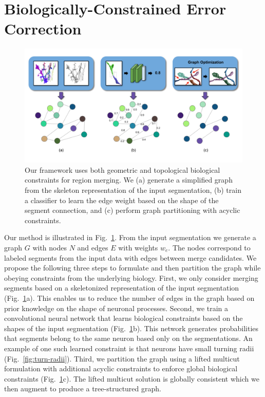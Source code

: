 \section{Biologically-Constrained Error Correction}

\begin{figure}[t!]
	\centering
	\includegraphics[width=0.75\linewidth]{./figures/teaser_v4.png}
	\caption{Our framework uses both geometric and topological biological constraints for region merging. We (a) generate a simplified graph from the skeleton representation of the input segmentation, (b) train a classifier to learn the edge weight based on the shape of the segment connection, and (c) perform graph partitioning with acyclic constraints.}
	\label{fig:teaser_pipeline}
\end{figure}

Our method is illustrated in Fig.~\ref{fig:teaser_pipeline}.
From the input segmentation we generate a graph $G$ with nodes $N$ and edges $E$ with weights $w_e$. 
The nodes correspond to labeled segments from the input data with edges between merge candidates.
We propose the following three steps to formulate and then partition the graph while obeying constraints from the underlying biology.
First, we only consider merging segments based on a skeletonized representation of the input segmentation (Fig.~\ref{fig:teaser_pipeline}a).
This enables us to reduce the number of edges in the graph based on prior knowledge on the shape of neuronal processes.
Second, we train a convolutional neural network that learns biological constraints based on the shapes of the input segmentation (Fig.~\ref{fig:teaser_pipeline}b).
This network generates probabilities that segments belong to the same neuron based only on the segmentations. 
An example of one such learned constraint is that neurons have small turning radii (Fig.~\ref{fig:turn-radii}).
Third, we partition the graph using a lifted multicut formulation with additional acyclic constraints to enforce global biological constraints (Fig.~\ref{fig:teaser_pipeline}c).
The lifted multicut solution is globally consistent which we then augment to produce a tree-structured graph.

